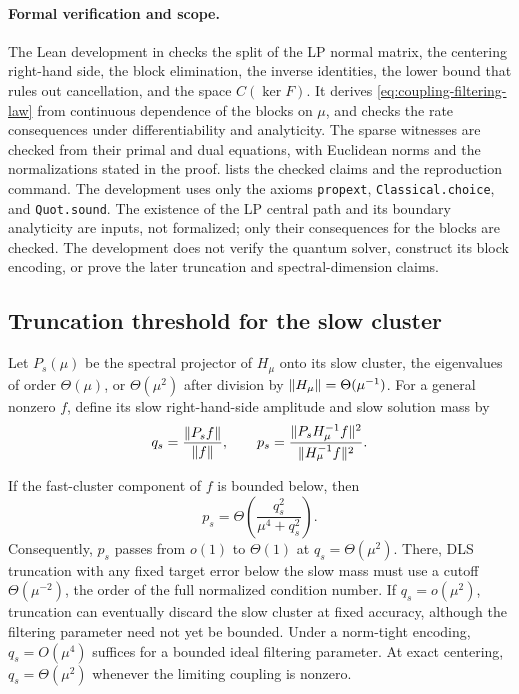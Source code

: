 \paragraph{Formal verification and scope.}
The Lean development in  checks the
split of the LP normal matrix, the centering right-hand side, the block
elimination, the inverse identities, the lower bound that rules out
cancellation, and the space $C(\ker F)$. It derives
\eqref{eq:coupling-filtering-law} from continuous dependence of the blocks
on $\mu$, and checks the rate consequences under differentiability and
analyticity.  The sparse witnesses are checked from their primal and dual
equations, with Euclidean norms and the normalizations stated in the proof.
 lists the checked claims and the reproduction
command.  The development uses only the axioms \texttt{propext},
\texttt{Classical.choice}, and \texttt{Quot.sound}.  The existence of the LP
central path and its boundary analyticity are inputs, not formalized; only
their consequences for the blocks are checked.  The development does not
verify the quantum solver, construct its block encoding, or prove the later
truncation and spectral-dimension claims.

\subsection{Truncation threshold for the slow cluster}
\label{sec:beyond-kappa-truncation}

Let $P_s(\mu)$ be the spectral projector of $H_\mu$ onto its slow cluster,
the eigenvalues of order $\Theta(\mu)$, or $\Theta(\mu^2)$ after division by
$\lVert H_\mu\rVert=\Theta(\mu^{-1})$.
For a general nonzero $f$, define its slow right-hand-side amplitude and
slow solution mass by
\[
 q_s=\frac{\lVert P_sf\rVert}{\lVert f\rVert},\qquad
 p_s=\frac{\lVert P_sH_\mu^{-1}f\rVert^2}{\lVert H_\mu^{-1}f\rVert^2}.
\]

\begin{proposition}
\label{prop:dls-truncation-transition}
If the fast-cluster component of $f$ is bounded below, then
\begin{equation}
 p_s=\Theta\!\left(\frac{q_s^2}{\mu^4+q_s^2}\right).
 \label{eq:slow-solution-mass}
\end{equation}
Consequently, $p_s$ passes from $o(1)$ to $\Theta(1)$ at
$q_s=\Theta(\mu^2)$.  There, DLS truncation with any fixed target error
below the slow mass must use a cutoff $\Theta(\mu^{-2})$, the order of the
full normalized condition number.  If $q_s=o(\mu^2)$, truncation can
eventually discard the slow cluster at fixed accuracy, although the
filtering parameter need not yet be bounded.  Under a norm-tight encoding,
$q_s=O(\mu^4)$ suffices for a bounded ideal filtering parameter.  At exact
centering, $q_s=\Theta(\mu^2)$ whenever the limiting coupling is nonzero.
\end{proposition}

